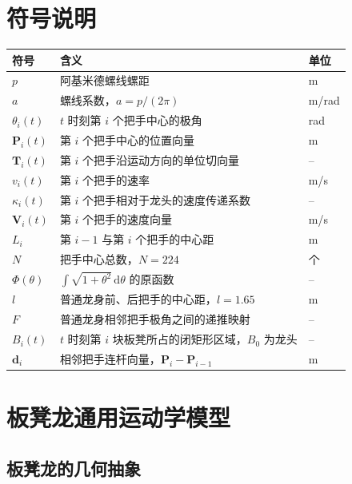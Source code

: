\documentclass[
  11pt,
  UTF8]{ctexart}
\begin{document}
\hypertarget{ux7b26ux53f7ux8bf4ux660e}{%
\section{符号说明}\label{ux7b26ux53f7ux8bf4ux660e}}

\begin{longtable}[]{@{}lll@{}}
\toprule
符号 & 含义 & 单位 \\
\midrule
\endhead
\(p\) & 阿基米德螺线螺距 & m \\
\(a\) & 螺线系数，\(a=p/(2\pi)\) & m/rad \\
\(\theta_i(t)\) & \(t\) 时刻第 \(i\) 个把手中心的极角 & rad \\
\(\boldsymbol P_i(t)\) & 第 \(i\) 个把手中心的位置向量 & m \\
\(\boldsymbol T_i(t)\) & 第 \(i\) 个把手沿运动方向的单位切向量 & -- \\
\(v_i(t)\) & 第 \(i\) 个把手的速率 & m/s \\
\(\kappa_i(t)\) & 第 \(i\) 个把手相对于龙头的速度传递系数 & -- \\
\(\boldsymbol V_i(t)\) & 第 \(i\) 个把手的速度向量 & m/s \\
\(L_i\) & 第 \(i-1\) 与第 \(i\) 个把手的中心距 & m \\
\(N\) & 把手中心总数，\(N=224\) & 个 \\
\(\Phi(\theta)\) & \(\int\sqrt{1+\theta^2}\,\mathrm d\theta\) 的原函数 &
-- \\
\(l\) & 普通龙身前、后把手的中心距，\(l=1.65\) & m \\
\(F\) & 普通龙身相邻把手极角之间的递推映射 & -- \\
\(B_i(t)\) & \(t\) 时刻第 \(i\) 块板凳所占的闭矩形区域，\(B_0\) 为龙头 & -- \\
\(\boldsymbol d_i\) &
相邻把手连杆向量，\(\boldsymbol P_i-\boldsymbol P_{i-1}\) & m \\
\bottomrule
\end{longtable}

\hypertarget{ux6a21ux578bux51c6ux5907ux8defux5f84ux7ea6ux675fux5b9aux957fux94feux901aux7528ux6a21ux578b}{%
\section{板凳龙通用运动学模型}\label{ux6a21ux578bux51c6ux5907ux8defux5f84ux7ea6ux675fux5b9aux957fux94feux901aux7528ux6a21ux578b}}

\subsection{板凳龙的几何抽象}
\end{document}
